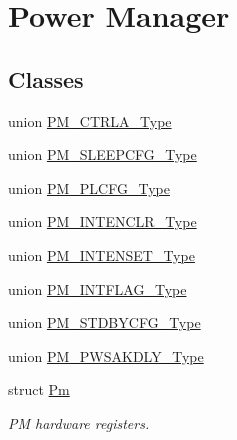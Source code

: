 \hypertarget{group___s_a_m_l21___p_m}{}\section{Power Manager}
\label{group___s_a_m_l21___p_m}
\subsection*{Classes}
\begin{DoxyCompactItemize}
\item 
union \hyperlink{union_p_m___c_t_r_l_a___type}{P\+M\+\_\+\+C\+T\+R\+L\+A\+\_\+\+Type}
\item 
union \hyperlink{union_p_m___s_l_e_e_p_c_f_g___type}{P\+M\+\_\+\+S\+L\+E\+E\+P\+C\+F\+G\+\_\+\+Type}
\item 
union \hyperlink{union_p_m___p_l_c_f_g___type}{P\+M\+\_\+\+P\+L\+C\+F\+G\+\_\+\+Type}
\item 
union \hyperlink{union_p_m___i_n_t_e_n_c_l_r___type}{P\+M\+\_\+\+I\+N\+T\+E\+N\+C\+L\+R\+\_\+\+Type}
\item 
union \hyperlink{union_p_m___i_n_t_e_n_s_e_t___type}{P\+M\+\_\+\+I\+N\+T\+E\+N\+S\+E\+T\+\_\+\+Type}
\item 
union \hyperlink{union_p_m___i_n_t_f_l_a_g___type}{P\+M\+\_\+\+I\+N\+T\+F\+L\+A\+G\+\_\+\+Type}
\item 
union \hyperlink{union_p_m___s_t_d_b_y_c_f_g___type}{P\+M\+\_\+\+S\+T\+D\+B\+Y\+C\+F\+G\+\_\+\+Type}
\item 
union \hyperlink{union_p_m___p_w_s_a_k_d_l_y___type}{P\+M\+\_\+\+P\+W\+S\+A\+K\+D\+L\+Y\+\_\+\+Type}
\item 
struct \hyperlink{struct_pm}{Pm}
\begin{DoxyCompactList}\small\item\em P\+M hardware registers. \end{DoxyCompactList}\end{DoxyCompactItemize}
